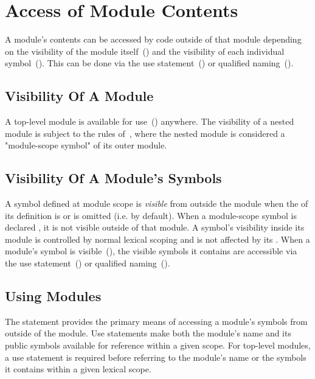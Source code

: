 \section{Access of Module Contents}
\label{Access_Of_Module_Contents}

A module's contents can be accessed by code outside of that module
depending on the visibility of the module
itself~() and the visibility of each
individual symbol~().  This can be done
via the use statement~() or qualified
naming~().

\subsection{Visibility Of A Module}
\label{Visibility_Of_A_Module}

A top-level module is available for use~() anywhere. The
visibility of a nested module is subject to the rules
of~, where the nested module is considered
a "module-scope symbol" of its outer module.

\subsection{Visibility Of A Module's Symbols}
\label{Visibility_Of_Symbols}

A symbol defined at module scope is \emph{visible} from outside the
module when the  of its definition
is  or is omitted (i.e. by default). When a module-scope
symbol is declared
, it is not visible outside of that module. A
symbol's visibility inside its module is controlled by normal lexical
scoping and is not affected by its .  When a
module's symbol is visible~(), the
visible symbols it contains are accessible via the use
statement~() or qualified
naming~().

\subsection{Using Modules}
\label{Using_Modules}

The  statement provides the primary means of accessing a
module's symbols from outside of the module.  Use statements make both
the module's name and its public symbols available for reference
within a given scope.  For top-level modules, a use statement is
required before referring to the module's name or the symbols it
contains within a given lexical scope.

